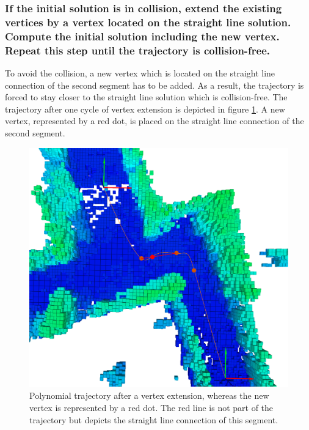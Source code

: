 \subsubsection{If the initial solution is in collision, extend the existing vertices by a vertex located on the straight line solution. Compute the initial solution including the new vertex. Repeat this step until the trajectory is collision-free.}

To avoid the collision, a new vertex which is located on the straight line connection of the second segment has to be added. As a result, the trajectory is forced to stay closer to the straight line solution which is collision-free. \newline
The trajectory after one cycle of vertex extension is depicted in figure \ref{pic:RRTstep3}. A new vertex, represented by a red dot, is placed on the straight line connection of the second segment.

\begin{figure}[h]
   \centering
   \includegraphics[trim = 45mm 0mm 35mm 5mm, clip,width=1\textwidth]{pics/extensionBLongPred.eps}
   \caption{Polynomial trajectory after a vertex extension, whereas the new vertex is represented by a red dot. The red line is not part of the trajectory but depicts the straight line connection of this segment.}
\label{pic:RRTstep3}
\end{figure}

